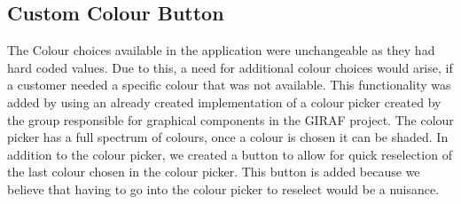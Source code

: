 \subsection{Custom Colour Button}
The Colour choices available in the application were unchangeable as they had hard coded values.
Due to this, a need for additional colour choices would arise, if a customer needed a specific colour that was not available.
This functionality was added by using an already created implementation of a colour picker created by the group responsible for graphical components in the GIRAF project. 
The colour picker has a full spectrum of colours, once a colour is chosen it can be shaded.
In addition to the colour picker, we created a button to allow for quick reselection of the last colour chosen in the colour picker.
This button is added because we believe that having to go into the colour picker to reselect would be a nuisance.